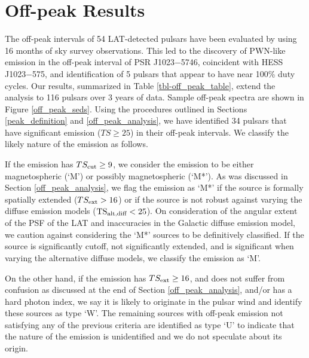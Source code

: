 \section{Off-peak Results}

The off-peak intervals of 54 LAT-detected pulsars have
been evaluated by \citet{LAT_collaboration_PWNCAT_2011} using 16 months of sky survey observations.  
This led to the discovery of PWN-like emission
in the off-peak interval of PSR J1023$-$5746, coincident with HESS
J1023$-$575, and identification of 5 pulsars that appear to have near 100\%
duty cycles.  Our results, summarized in Table \ref{tbl-off_peak_table},
extend the analysis to 116 pulsars over 3 years of data.  
Sample off-peak spectra are shown in Figure \ref{off_peak_seds}.
Using the procedures outlined in Sections \ref{peak_definition}
and \ref{off_peak_analysis}, we have identified 34 pulsars that
have significant emission ($TS\geq25$) in their off-peak intervals.
We classify the likely nature of the emission as follows.

If the emission has $TS_{\rm cut}\geq9$, we consider the emission to be
either magnetospheric (`M') or possibly magnetospheric (`M*').
As was discussed in Section \ref{off_peak_analysis}, 
we flag the emission as `M*' if the source is formally spatially extended
($TS_{\rm ext}>16$) or if the source is not robust against varying
the diffuse emission models ($\mathrm{TS}_{\text{alt,diff}}<25$). 
On consideration of the angular extent of the PSF of the LAT and inaccuracies in the Galactic diffuse
emission model, we caution against considering the `M*' sources to be definitively classified.
If the source is significantly cutoff, not
significantly extended, and is significant when varying the alternative diffuse models,
we classify the emission as `M'.


On the other hand, if the
emission has $TS_{\rm ext}\geq16$, and does not suffer from confusion as
discussed at the end of Section \ref{off_peak_analysis}, and/or has a hard
photon index, we say it is likely
to originate in the pulsar wind and identify these sources as type `W'.
The remaining sources with off-peak emission not satisfying any of the
previous criteria are identified as type `U' to indicate that the nature
of the emission is unidentified and we do not speculate about its origin.


